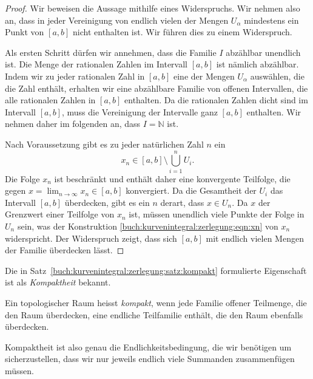 \begin{proof}
Wir beweisen die Aussage mithilfe eines Widerspruchs.
Wir nehmen also an, dass in jeder Vereinigung von endlich vielen
der Mengen $U_\alpha$ mindestens ein Punkt von $[a,b]$ nicht
enthalten ist.
Wir führen dies zu einem Widerspruch.

Als ersten Schritt dürfen wir annehmen, dass die Familie $I$ abzählbar
unendlich ist.
Die Menge der rationalen Zahlen im Intervall $[a,b]$ ist nämlich
abzählbar.
Indem wir zu jeder rationalen Zahl in $[a,b]$ eine der Mengen $U_\alpha$
auswählen, die die Zahl enthält, erhalten wir eine abzählbare Familie
von offenen Intervallen, die alle rationalen Zahlen in $[a,b]$
enthalten.
Da die rationalen Zahlen dicht sind im Intervall $[a,b]$, muss die
Vereinigung der Intervalle ganz $[a,b]$ enthalten.
Wir nehmen daher im folgenden an, dass $I=\mathbb{N}$ ist.

Nach Voraussetzung gibt es zu jeder natürlichen Zahl $n$ ein
\begin{equation}
x_n \in [a,b] \setminus \bigcup_{i=1}^n U_i.
\label{buch:kurvenintegral:zerlegung:eqn:xn}
\end{equation}
Die Folge $x_n$ ist beschränkt und enthält daher eine konvergente
Teilfolge, die gegen $x=\lim_{n\to\infty}x_n\in[a,b]$ konvergiert.
Da die Gesamtheit der $U_i$ das Intervall $[a,b]$ überdecken, gibt
es ein $n$ derart, dass $x\in U_n$.
Da $x$ der Grenzwert einer Teilfolge von $x_n$ ist, müssen unendlich
viele Punkte der Folge in $U_n$ sein, was der Konstruktion
\eqref{buch:kurvenintegral:zerlegung:eqn:xn}
von $x_n$ widerspricht.
Der Widerspruch zeigt, dass sich $[a,b]$ mit endlich vielen
Mengen der Familie überdecken lässt.
\end{proof}

Die in Satz~\ref{buch:kurvenintegral:zerlegung:satz:kompakt}
formulierte Eigenschaft ist als {\em Kompaktheit} bekannt.

\begin{definition}[Kompaktheit]
Ein topologischer Raum heisst {\em kompakt}, wenn jede Familie
%
offener Teilmenge, die den Raum überdecken, eine endliche Teilfamilie
enthält, die den Raum ebenfalls überdecken.
\end{definition}

Kompaktheit ist also genau die Endlichkeitsbedingung, die wir benötigen
um sicherzustellen, dass wir nur jeweils endlich viele Summanden
zusammenfügen müssen.

%
%
